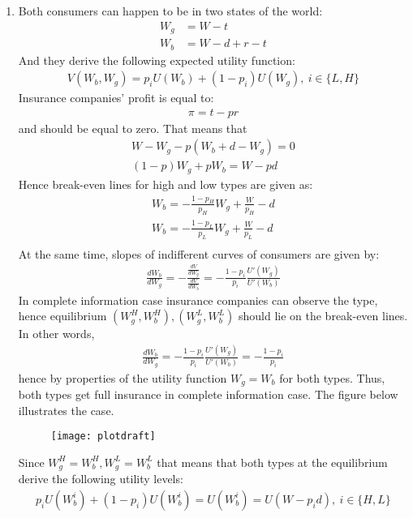 \documentclass[a4paper]{article}
\begin{document}
\begin{enumerate}
	\item Both consumers can happen to be in two states of the world:
	\begin{align*}
	W_g &= W - t\\
	W_b &= W - d + r - t
	\end{align*}
	And they derive the following expected utility function:
	\begin{align*}
	V(W_b, W_g) = p_i U(W_b) + (1 - p_i)U(W_g),\ i \in \{L, H\}
	\end{align*}
	Insurance companies' profit is equal to:
	\begin{align*}
	\pi = t - pr
	\end{align*}
	and should be equal to zero. That means that
	\begin{align*}
	W - W_g - p(W_b + d - W_g) = 0\\
	(1 - p)W_g + pW_b = W - pd
	\end{align*}
	Hence break-even lines for high and low types are given as:
	\begin{align*}
	W_b = -\frac{1-p_H}{p_H}W_g + \frac{W}{p_H} -d\\
	W_b = -\frac{1-p_L}{p_L}W_g + \frac{W}{p_L} -d\\	
	\end{align*}
	At the same time, slopes of indifferent curves of consumers are given by:
	\begin{align*}
	\frac{dW_b}{dW_g} = - \frac{\frac{dV}{dW_g}}{\frac{dV}{dW_b}} = -\frac{1-p_i}{p_i}\frac{U'(W_g)}{U'(W_b)}
	\end{align*}
	In complete information case insurance companies can observe the type, hence equilibrium $(W_g^H, W_b^H), (W_g^L, W_b^L)$ should lie on the break-even lines. In other words,
	\begin{align*}
	\frac{dW_b}{dW_g} = - \frac{1-p_i}{p_i}\frac{U'(W_g)}{U'(W_b)} = -\frac{1 - p_i}{p_i}
	\end{align*}
	hence by properties of the utility function $W_g = W_b$ for both types. Thus, both types get full insurance in complete information case. The figure below illustrates the case.
	\begin{figure}[H]
		\centering
		\texttt{[image: plotdraft]}
		\caption{}\label{fig1}
	\end{figure}
Since $W_g^H = W_b^H, W_g^L = W_b^L$ that means that both types at the equilibrium derive the following utility levels:
\begin{align*}
p_iU(W_b^i) + (1 - p_i)U(W_b^i) = U(W_b^i) = U(W - p_id),\ i \in \{H, L\}

\end{align*}
\end{enumerate}
\end{document}
